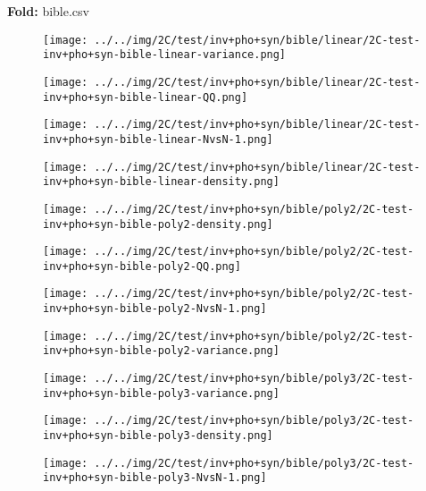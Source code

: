 \textbf{Fold:} bible.csv
\begin{figure}[H]
\centering	\texttt{[image: ../../img/2C/test/inv+pho+syn/bible/linear/2C-test-inv+pho+syn-bible-linear-variance.png]}
\end{figure}
\begin{figure}[H]
\centering	\texttt{[image: ../../img/2C/test/inv+pho+syn/bible/linear/2C-test-inv+pho+syn-bible-linear-QQ.png]}
\end{figure}
\begin{figure}[H]
\centering	\texttt{[image: ../../img/2C/test/inv+pho+syn/bible/linear/2C-test-inv+pho+syn-bible-linear-NvsN-1.png]}
\end{figure}
\begin{figure}[H]
\centering	\texttt{[image: ../../img/2C/test/inv+pho+syn/bible/linear/2C-test-inv+pho+syn-bible-linear-density.png]}
\end{figure}
\begin{figure}[H]
\centering	\texttt{[image: ../../img/2C/test/inv+pho+syn/bible/poly2/2C-test-inv+pho+syn-bible-poly2-density.png]}
\end{figure}
\begin{figure}[H]
\centering	\texttt{[image: ../../img/2C/test/inv+pho+syn/bible/poly2/2C-test-inv+pho+syn-bible-poly2-QQ.png]}
\end{figure}
\begin{figure}[H]
\centering	\texttt{[image: ../../img/2C/test/inv+pho+syn/bible/poly2/2C-test-inv+pho+syn-bible-poly2-NvsN-1.png]}
\end{figure}
\begin{figure}[H]
\centering	\texttt{[image: ../../img/2C/test/inv+pho+syn/bible/poly2/2C-test-inv+pho+syn-bible-poly2-variance.png]}
\end{figure}
\begin{figure}[H]
\centering	\texttt{[image: ../../img/2C/test/inv+pho+syn/bible/poly3/2C-test-inv+pho+syn-bible-poly3-variance.png]}
\end{figure}
\begin{figure}[H]
\centering	\texttt{[image: ../../img/2C/test/inv+pho+syn/bible/poly3/2C-test-inv+pho+syn-bible-poly3-density.png]}
\end{figure}
\begin{figure}[H]
\centering	\texttt{[image: ../../img/2C/test/inv+pho+syn/bible/poly3/2C-test-inv+pho+syn-bible-poly3-NvsN-1.png]}
\end{figure}

